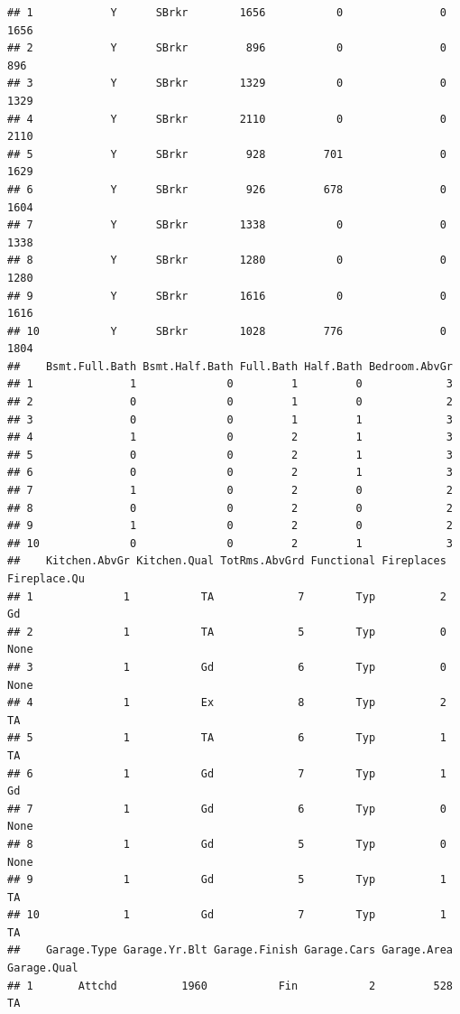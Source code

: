 \documentclass[
]{article}
\begin{document}
\begin{verbatim}
## 1            Y      SBrkr        1656           0               0        1656
## 2            Y      SBrkr         896           0               0         896
## 3            Y      SBrkr        1329           0               0        1329
## 4            Y      SBrkr        2110           0               0        2110
## 5            Y      SBrkr         928         701               0        1629
## 6            Y      SBrkr         926         678               0        1604
## 7            Y      SBrkr        1338           0               0        1338
## 8            Y      SBrkr        1280           0               0        1280
## 9            Y      SBrkr        1616           0               0        1616
## 10           Y      SBrkr        1028         776               0        1804
##    Bsmt.Full.Bath Bsmt.Half.Bath Full.Bath Half.Bath Bedroom.AbvGr
## 1               1              0         1         0             3
## 2               0              0         1         0             2
## 3               0              0         1         1             3
## 4               1              0         2         1             3
## 5               0              0         2         1             3
## 6               0              0         2         1             3
## 7               1              0         2         0             2
## 8               0              0         2         0             2
## 9               1              0         2         0             2
## 10              0              0         2         1             3
##    Kitchen.AbvGr Kitchen.Qual TotRms.AbvGrd Functional Fireplaces Fireplace.Qu
## 1              1           TA             7        Typ          2           Gd
## 2              1           TA             5        Typ          0         None
## 3              1           Gd             6        Typ          0         None
## 4              1           Ex             8        Typ          2           TA
## 5              1           TA             6        Typ          1           TA
## 6              1           Gd             7        Typ          1           Gd
## 7              1           Gd             6        Typ          0         None
## 8              1           Gd             5        Typ          0         None
## 9              1           Gd             5        Typ          1           TA
## 10             1           Gd             7        Typ          1           TA
##    Garage.Type Garage.Yr.Blt Garage.Finish Garage.Cars Garage.Area Garage.Qual
## 1       Attchd          1960           Fin           2         528          TA

\end{verbatim}
\end{document}
